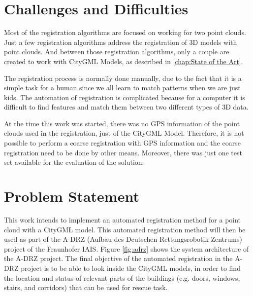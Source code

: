     \section{Challenges and Difficulties}
    
        Most of the registration algorithms are focused on working for two point clouds. 
        Just a few registration algorithms address the registration of 3D models with point clouds.
        And between those registration algorithms, only a couple are created to work with CityGML Models, as described in \autoref{chap:State of the Art}.
        \par      
        The registration process is normally done manually, due to the fact that it is a simple task for a human since we all learn to match patterns when we are just kids. 
        The automation of registration is complicated because for a computer it is difficult to find features and match them between two different types of 3D data.
        \par
        At the time this work was started, there was no GPS information of the point clouds used in the registration, just of the CityGML Model. 
        Therefore, it is not possible to perform a coarse registration with GPS information and the coarse registration need to be done by other means.
        Moreover, there was just one test set available for the evaluation of the solution.

    \section{Problem Statement}
        This work intends to implement an automated registration method for a point cloud with a CityGML model.
        This automated registration method will then be used as part of the A-DRZ (Aufbau des Deutschen Rettungsrobotik-Zentrums) project of the Fraunhofer IAIS.
        Figure \ref{fig:adrz} shows the system architecture of the A-DRZ project. 
        The final objective of the automated registration in the A-DRZ project is to be able to look inside the CityGML models, in order to 
        find the location and status of relevant parts of the buildings (e.g. doors, windows, stairs, and corridors) that can be used for rescue task.

